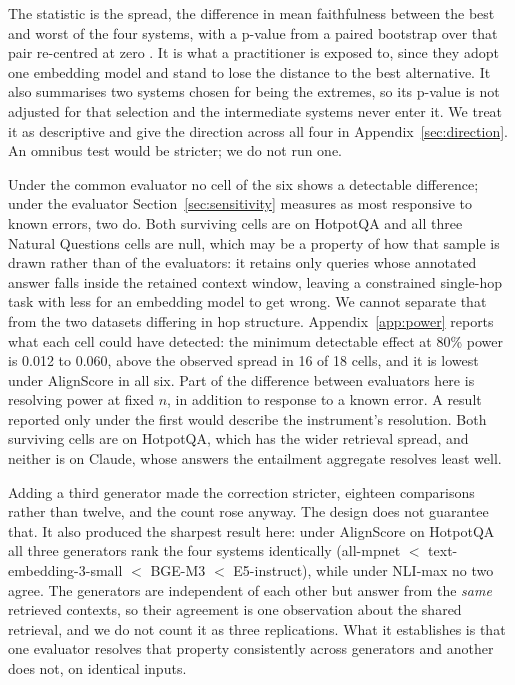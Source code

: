 \documentclass[11pt]{article}
\begin{document}
The statistic is the spread, the difference in mean faithfulness between the best and worst of the four systems, with a p-value from a paired bootstrap over that pair re-centred at zero \citep{dror-etal-2018}. It is what a practitioner is exposed to, since they adopt one embedding model and stand to lose the distance to the best alternative. It also summarises two systems chosen for being the extremes, so its p-value is not adjusted for that selection and the intermediate systems never enter it. We treat it as descriptive and give the direction across all four in Appendix~\ref{sec:direction}. An omnibus test would be stricter; we do not run one.

Under the common evaluator no cell of the six shows a detectable difference; under the evaluator Section~\ref{sec:sensitivity} measures as most responsive to known errors, two do. Both surviving cells are on HotpotQA and all three Natural Questions cells are null, which may be a property of how that sample is drawn rather than of the evaluators: it retains only queries whose annotated answer falls inside the retained context window, leaving a constrained single-hop task with less for an embedding model to get wrong. We cannot separate that from the two datasets differing in hop structure. Appendix~\ref{app:power} reports what each cell could have detected: the minimum detectable effect at 80\% power is 0.012 to 0.060, above the observed spread in 16 of 18 cells, and it is lowest under AlignScore in all six. Part of the difference between evaluators here is resolving power at fixed $n$, in addition to response to a known error. A result reported only under the first would describe the instrument's resolution. Both surviving cells are on HotpotQA, which has the wider retrieval spread, and neither is on Claude, whose answers the entailment aggregate resolves least well.

Adding a third generator made the correction stricter, eighteen comparisons rather than twelve, and the count rose anyway. The design does not guarantee that. It also produced the sharpest result here: under AlignScore on HotpotQA all three generators rank the four systems identically (all-mpnet $<$ text-embedding-3-small $<$ BGE-M3 $<$ E5-instruct), while under NLI-max no two agree. The generators are independent of each other but answer from the \emph{same} retrieved contexts, so their agreement is one observation about the shared retrieval, and we do not count it as three replications. What it establishes is that one evaluator resolves that property consistently across generators and another does not, on identical inputs.
\end{document}
